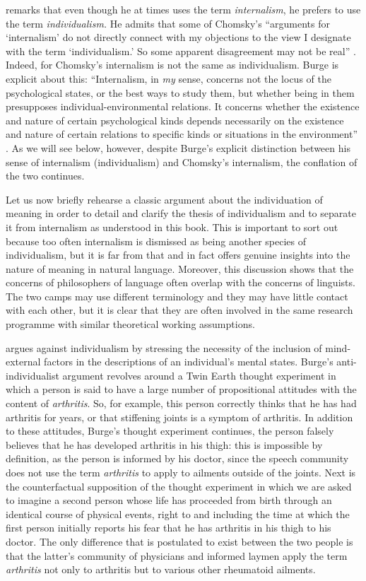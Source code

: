 \citet{Burge2003} remarks that even though he at times uses the term \textit{internalism}, he prefers to use the term \textit{individualism.} He admits that some of Chomsky’s “arguments for ‘internalism’ do not directly connect with my objections to the view I designate with the term ‘individualism.’ So some apparent disagreement may not be real” \citep[453]{Burge2003}. Indeed, for Chomsky’s internalism is not the same as individualism. Burge is explicit about this: “Internalism, in \textit{my }sense, concerns not the locus of the psychological states, or the best ways to study them, but whether being in them presupposes individual-environmental relations. It concerns whether the existence and nature of certain psychological kinds depends necessarily on the existence and nature of certain relations to specific kinds or situations in the environment” \citep[454, emphasis in original]{Burge2003}. As we will see below, however, despite Burge’s explicit distinction between his sense of internalism (individualism) and Chomsky’s internalism, the conflation of the two continues.

Let us now briefly rehearse a classic argument about the individuation of meaning in order to detail and clarify the thesis of individualism and to separate it from internalism as understood in this book. This is important to sort out because too often internalism is dismissed as being another species of individualism, but it is far from that and in fact offers genuine insights into the nature of meaning in natural language. Moreover, this discussion shows that the concerns of philosophers of language often overlap with the concerns of linguists. The two camps may use different terminology and they may have little contact with each other, but it is clear that they are often involved in the same research programme with similar theoretical working assumptions.

\citet{Burge1979} argues against individualism by stressing the necessity of the inclusion of mind-external factors in the descriptions of an individual’s mental states. Burge’s anti-individualist argument revolves around a Twin Earth thought experiment in which a person is said to have a large number of propositional attitudes with the content of \textit{arthritis}. So, for example, this person correctly thinks that he has had arthritis for years, or that stiffening joints is a symptom of arthritis. In addition to these attitudes, Burge’s thought experiment continues, the person falsely believes that he has developed arthritis in his thigh: this is impossible by definition, as the person is informed by his doctor, since the speech community does not use the term \textit{arthritis} to apply to ailments outside of the joints. Next is the counterfactual supposition of the thought experiment in which we are asked to imagine a second person whose life has proceeded from birth through an identical course of physical events, right to and including the time at which the first person initially reports his fear that he has arthritis in his thigh to his doctor. The only difference that is postulated to exist between the two people is that the latter’s community of physicians and informed laymen apply the term \textit{arthritis} not only to arthritis but to various other rheumatoid ailments. 

